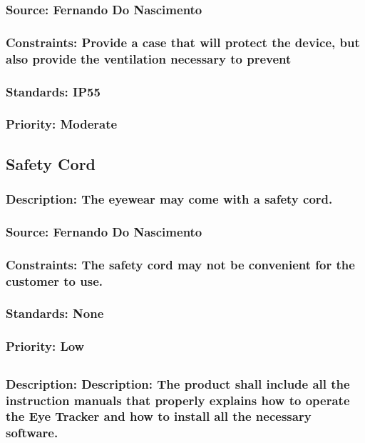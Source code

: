 \subsubsection{Source: Fernando Do Nascimento}
\subsubsection{Constraints: Provide a case that will protect the device, but also provide the ventilation necessary to prevent}
\subsubsection{Standards: IP55}
\subsubsection{Priority: Moderate}

\subsection{\bfEyewear Safety Cord}
\subsubsection{Description: The eyewear may come with a safety cord.}
\subsubsection{Source: Fernando Do Nascimento}
\subsubsection{Constraints: The safety cord may not be convenient for the customer to use.}
\subsubsection{Standards: None}
\subsubsection{Priority: Low}

\subsection{\bfManuals}
\subsubsection{Description: Description: The product shall include all the instruction manuals that properly explains how to operate the Eye Tracker and how to install all the necessary software.}
